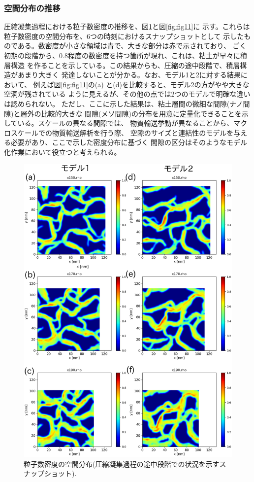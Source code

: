 \subsubsection{空間分布の推移}
圧縮凝集過程における粒子数密度の推移を、図\ref{fig:fig10}と図\ref{fig:fig11}に
示す。これらは粒子数密度の空間分布を、6つの時刻におけるスナップショットとして
示したものである。数密度が小さな領域は青で、大きな部分は赤で示されており、
ごく初期の段階から、0.8程度の数密度を持つ箇所が現れ、これは、粘土が早々に積層構造
を作ることを示している。この結果からも、圧縮の途中段階で、積層構造があまり大きく
発達しないことが分かる。なお、モデル1と2に対する結果において、 例えば図\ref{fig:fig11}の(a)
と(d)を比較すると、モデル2の方がやや大きな空洞が残されている
ように見えるが、その他の点では2つのモデルで明確な違いは認められない。
ただし、ここに示した結果は、粘土層間の微細な間隙(ナノ間隙)と層外の比較的大きな
間隙(メソ間隙)の分布を用意に定量化できることを示している。スケールの異なる間隙では、
物質輸送挙動が異なることから、マクロスケールでの物質輸送解析を行う際、
空隙のサイズと連結性のモデルを与える必要があり、ここで示した密度分布に基づく
間隙の区分はそのようなモデル化作業において役立つと考えられる。
\begin{figure}[h]
	\begin{center}
	\includegraphics[width=1.0\linewidth]{Figs/fig10.eps} 
	\end{center}
	\caption{
		粒子数密度の空間分布(圧縮凝集過程の途中段階での状況を示すスナップショット).
	} 
	\label{fig:fig10}
\end{figure}

